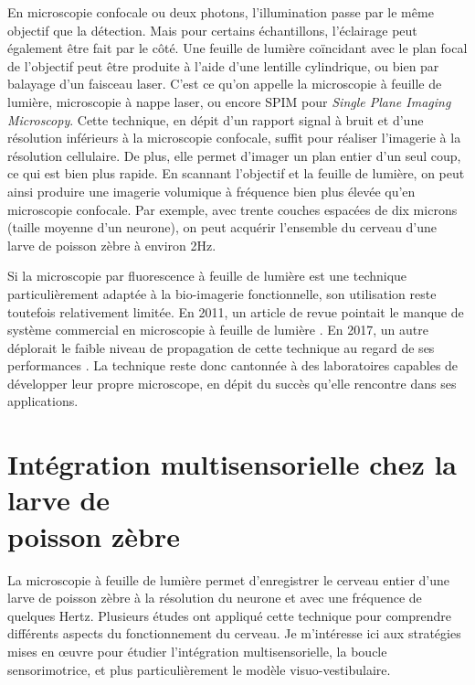 En microscopie confocale ou deux photons, l'illumination passe par le même objectif que la détection. Mais pour certains échantillons, l'éclairage peut également être fait par le côté. Une feuille de lumière coïncidant avec le plan focal de l'objectif peut être produite à l'aide d'une lentille cylindrique, ou bien par balayage d'un faisceau laser. C'est ce qu'on appelle la microscopie à feuille de lumière, microscopie à nappe laser, ou encore SPIM pour \emph{Single Plane Imaging Microscopy}. Cette technique, en dépit d'un rapport signal à bruit et d'une résolution inférieurs à la microscopie confocale, suffit pour réaliser l'imagerie à la résolution cellulaire. De plus, elle permet d'imager un plan entier d'un seul coup, ce qui est bien plus rapide. En scannant l'objectif et la feuille de lumière, on peut ainsi produire une imagerie volumique à fréquence bien plus élevée qu'en microscopie confocale. Par exemple, avec trente couches espacées de dix microns (taille moyenne d'un neurone), on peut acquérir l'ensemble du cerveau d'une larve de poisson zèbre à environ 2Hz.

Si la microscopie par fluorescence à feuille de lumière est une technique particulièrement adaptée à la bio-imagerie fonctionnelle, son utilisation reste toutefois relativement limitée. En 2011, un article de revue pointait le manque de système commercial en microscopie à feuille de lumière \cite{santi_light_2011}. En 2017, un autre déplorait le faible niveau de propagation de cette technique au regard de ses performances \cite{power_guide_2017}. La technique reste donc cantonnée à des laboratoires capables de développer leur propre microscope, en dépit du succès qu'elle rencontre dans ses applications.



\section[Chez la larve de poisson zèbre]{Intégration multisensorielle chez la larve de \\ poisson zèbre}

La microscopie à feuille de lumière permet d'enregistrer le cerveau entier d'une larve de poisson zèbre à la résolution du neurone et avec une fréquence de quelques Hertz. Plusieurs études ont appliqué cette technique pour comprendre différents aspects du fonctionnement du cerveau. Je m'intéresse ici aux stratégies mises en œuvre pour étudier l'intégration multisensorielle, la boucle sensorimotrice, et plus particulièrement le modèle visuo-vestibulaire.

